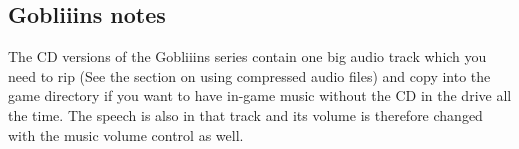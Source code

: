 \subsection{Gobliiins notes}

The CD versions of the Gobliiins series contain one big audio track which you
need to rip (See the section on using compressed audio files) and copy into
the game directory if you want to have in-game music without the CD in the
drive all the time. The speech is also in that track and its volume is
therefore changed with the music volume control as well.


